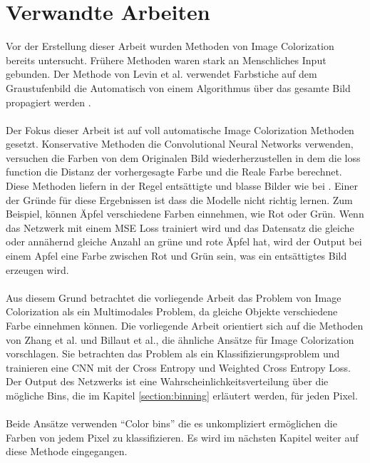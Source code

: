 \section{Verwandte Arbeiten}\label{subsection:verwandte-arbeiten}
Vor der Erstellung dieser Arbeit wurden Methoden von Image Colorization bereits untersucht. Frühere Methoden waren stark an Menschliches Input
gebunden. Der Methode von Levin et al. verwendet Farbstiche auf dem Graustufenbild die Automatisch von einem Algorithmus über das gesamte 
Bild propagiert werden \cite{10.1145/1015706.1015780}.
\\
\\
Der Fokus dieser Arbeit ist auf voll automatische Image Colorization Methoden gesetzt. Konservative Methoden die Convolutional Neural Networks 
verwenden, versuchen die Farben von dem Originalen Bild wiederherzustellen in dem die \gls{loss function} die Distanz der vorhergesagte 
Farbe und die Reale Farbe berechnet. Diese Methoden liefern in der Regel entsättigte und blasse Bilder wie bei \cite{zbulak2019image}. 
Einer der Gründe für diese Ergebnissen ist dass die Modelle nicht richtig lernen. Zum Beispiel, können Äpfel verschiedene Farben einnehmen, 
wie Rot oder Grün. Wenn das Netzwerk mit einem MSE Loss trainiert wird und das Datensatz die gleiche oder annähernd gleiche Anzahl an
grüne und rote Äpfel hat, wird der Output bei einem Apfel eine Farbe zwischen Rot und Grün sein, was ein entsättigtes Bild erzeugen wird.
\\
\\
Aus diesem Grund betrachtet die vorliegende Arbeit das Problem von Image Colorization als ein Multimodales Problem, 
da gleiche Objekte verschiedene Farbe einnehmen können.
Die vorliegende Arbeit orientiert sich auf die Methoden von Zhang et al. und Billaut et al., die ähnliche Ansätze für Image Colorization vorschlagen.
Sie betrachten das Problem als ein Klassifizierungsproblem und trainieren eine CNN mit der Cross Entropy und Weighted Cross Entropy Loss. 
Der Output des Netzwerks ist eine Wahrscheinlichkeitsverteilung über die mögliche Bins, die im Kapitel \ref{section:binning} erläutert werden, 
für jeden Pixel.
\\
\\
Beide Ansätze verwenden ``Color \gls{bin}s'' die es unkompliziert ermöglichen die Farben von jedem Pixel zu klassifizieren. 
Es wird im nächsten Kapitel weiter auf diese Methode eingegangen.
